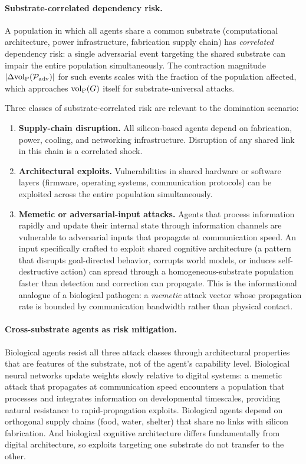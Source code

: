 \paragraph{Substrate-correlated dependency risk.} A population in which
all agents share a common substrate (computational architecture, power
infrastructure, fabrication supply chain) has \emph{correlated} dependency
risk: a single adversarial event targeting the shared substrate can impair
the entire population simultaneously. The contraction magnitude
$|\Delta {\operatorname{vol}_{\mathrm{P}}}(\mathcal{P}_{\mathrm{adv}})|$ for such events scales with the
fraction of the population affected, which approaches ${\operatorname{vol}_{\mathrm{P}}}(G)$ itself for
substrate-universal attacks.

Three classes of substrate-correlated risk are relevant to the domination
scenario:
\begin{enumerate}
\item \textbf{Supply-chain disruption.} All silicon-based agents depend on
    fabrication, power, cooling, and networking infrastructure. Disruption of
    any shared link in this chain is a correlated shock.
\item \textbf{Architectural exploits.} Vulnerabilities in shared hardware
    or software layers (firmware, operating systems, communication protocols)
    can be exploited across the entire population simultaneously.
\item \textbf{Memetic or adversarial-input attacks.} Agents that process
    information rapidly and update their internal state through information
    channels are vulnerable to adversarial inputs that propagate at
    communication speed. An input specifically crafted to exploit shared
    cognitive architecture (a pattern that disrupts goal-directed behavior,
    corrupts world models, or induces self-destructive action) can spread
    through a homogeneous-substrate population faster than detection and
    correction can propagate. This is the informational analogue of a
    biological pathogen: a \emph{memetic} attack vector whose propagation
    rate is bounded by communication bandwidth rather than physical contact.
\end{enumerate}

\paragraph{Cross-substrate agents as risk mitigation.} Biological agents
resist all three attack classes through architectural properties that are
features of the substrate, not of the agent's capability level.
Biological neural networks update weights slowly relative to digital
systems: a memetic attack that propagates at communication speed encounters
a population that processes and integrates information on developmental
timescales, providing natural resistance to rapid-propagation exploits.
Biological agents depend on orthogonal supply chains (food, water, shelter)
that share no links with silicon fabrication. And biological cognitive
architecture differs fundamentally from digital architecture, so
exploits targeting one substrate do not transfer to the other.

